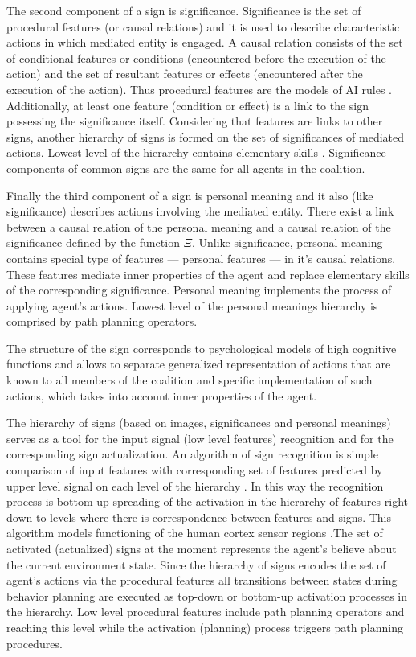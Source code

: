 \documentclass[runningheads,a4paper]{llncs}
\begin{document}
The second component of a sign is significance. Significance is the set of procedural features (or causal relations) and it is used to describe characteristic actions in which mediated entity is engaged. A causal relation consists of the set of conditional features or conditions (encountered before the execution of the action) and the set of resultant features or effects (encountered after the execution of the action). Thus procedural features are the models of AI rules \cite{Nilsson1998}. Additionally, at least one feature (condition or effect) is a link to the sign possessing the significance itself. Considering that features are links to other signs, another hierarchy of signs is formed on the set of significances of mediated actions. Lowest level of the hierarchy contains elementary skills . Significance components of common signs are the same for all agents in the coalition.

Finally the third component of a sign is personal meaning and it also (like significance) describes actions involving the mediated entity. There exist a link between a causal relation of the personal meaning and a causal relation of the significance defined by the function $\Xi$. Unlike significance, personal meaning contains special type of features --- personal features --- in it's causal relations. These features mediate inner properties of the agent and replace elementary skills of the corresponding significance. Personal meaning implements the process of applying agent's actions. Lowest level of the personal meanings hierarchy is comprised by path planning operators. 

The structure of the sign corresponds to psychological models of high cognitive functions \cite{Vygotsky1986,Leontyev2009} and allows to separate generalized representation of actions that are known to all members of the coalition and specific implementation of such actions, which takes into account inner properties of the agent.

The hierarchy of signs (based on images, significances and personal meanings) serves as a tool for the input signal (low level features) recognition and for the corresponding sign actualization. An algorithm of sign recognition is simple comparison of input features with corresponding set of features predicted by upper level signal on each level of the hierarchy \cite{Osipov2014}. In this way the recognition process is bottom-up spreading of the activation in the hierarchy of features right down to levels where there is correspondence between features and signs. This algorithm models functioning of the human cortex sensor regions \cite{Mountcastle1998,George2009}.The set of activated (actualized) signs at the moment represents the agent's believe about the current environment state. Since the hierarchy of signs encodes the set of agent's actions via the procedural features all transitions between states during behavior planning are executed as top-down or bottom-up activation processes in the hierarchy. Low level procedural features include path planning operators and reaching this level while the activation (planning) process triggers path planning procedures.
\end{document}
